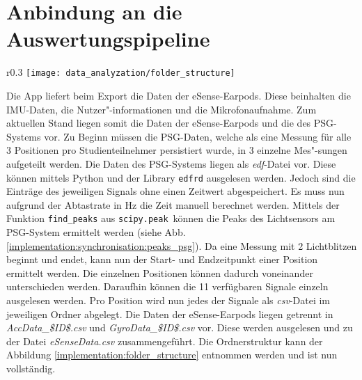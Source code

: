 \section{Anbindung an die Auswertungspipeline}
\label{ch:Implementierung:way_to_pipeline}
\begin{wrapfigure}{r}{0.3\textwidth}
  \centering
  \texttt{[image: data\_analyzation/folder\_structure]}
  \caption{Ordnerstruktur des Datensatzes}
  \label{implementation:folder_structure}
\end{wrapfigure}
Die App liefert beim Export die Daten der eSense-Earpods.
Diese beinhalten die IMU-Daten, die Nutzer"-informationen und die Mikrofonaufnahme.
Zum aktuellen Stand liegen somit die Daten der eSense-Earpods und die des PSG-Systems vor. 
Zu Beginn müssen die PSG-Daten, welche als eine Messung für alle 3 Positionen pro Studienteilnehmer persistiert wurde, in 3 einzelne Mes"-sungen aufgeteilt werden.
Die Daten des PSG-Systems liegen als \textit{edf}-Datei vor. 
Diese können mittels Python und der Library \texttt{edfrd} ausgelesen werden.
Jedoch sind die Einträge des jeweiligen Signals ohne einen Zeitwert abgespeichert. 
Es muss nun aufgrund der Abtastrate in $\si{\hertz}$ die Zeit manuell berechnet werden. 
Mittels der Funktion \texttt{find\_peaks} aus \texttt{scipy.peak}\ können die Peaks des Lichtsensors am PSG-System ermittelt werden (siehe Abb. \ref{implementation:synchronisation:peaks_psg}).
Da eine Messung mit 2 Lichtblitzen beginnt und endet, kann nun der Start- und Endzeitpunkt einer Position ermittelt werden. 
Die einzelnen Positionen können dadurch voneinander unterschieden werden. 
Daraufhin können die 11 verfügbaren Signale einzeln ausgelesen werden.
Pro Position wird nun jedes der Signale als \textit{csv}-Datei im jeweiligen Ordner abgelegt.
Die Daten der eSense-Earpods liegen getrennt in \newline \textit{AccData\_\$ID\$.csv} und \textit{GyroData\_\$ID\$.csv} vor. 
Diese werden ausgelesen und zu der Datei \textit{eSenseData.csv} zusammengeführt.
Die Ordnerstruktur kann der Abbildung \ref{implementation:folder_structure} entnommen werden und ist nun vollständig.

